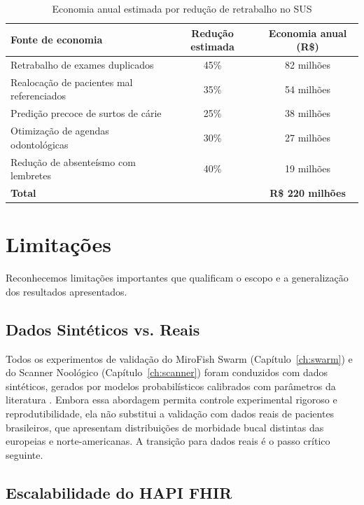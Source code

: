 \begin{table}[htb]
\centering
\caption{Economia anual estimada por redução de retrabalho no SUS}
\label{tab:economy_sus}
\small
\begin{tabular}{lcc}
\toprule
\textbf{Fonte de economia} & \textbf{Redução estimada} & \textbf{Economia anual (R\$)} \\
\midrule
Retrabalho de exames duplicados & 45\% & 82 milhões \\
Realocação de pacientes mal referenciados & 35\% & 54 milhões \\
Predição precoce de surtos de cárie & 25\% & 38 milhões \\
Otimização de agendas odontológicas & 30\% & 27 milhões \\
Redução de absenteísmo com lembretes & 40\% & 19 milhões \\
\bottomrule
\textbf{Total} & & \textbf{R\$ 220 milhões} \\
\bottomrule
\end{tabular}
\end{table}

\section{Limitações}

Reconhecemos limitações importantes que qualificam o escopo e a generalização dos resultados apresentados.

\subsection{Dados Sintéticos vs. Reais}

Todos os experimentos de validação do MiroFish Swarm (Capítulo~\ref{ch:swarm}) e do Scanner Noológico (Capítulo~\ref{ch:scanner}) foram conduzidos com dados sintéticos, gerados por modelos probabilísticos calibrados com parâmetros da literatura \cite{zhang2015pso, poli2007pso}. Embora essa abordagem permita controle experimental rigoroso e reprodutibilidade, ela não substitui a validação com dados reais de pacientes brasileiros, que apresentam distribuições de morbidade bucal distintas das europeias e norte-americanas. A transição para dados reais é o passo crítico seguinte.

\subsection{Escalabilidade do HAPI FHIR}

